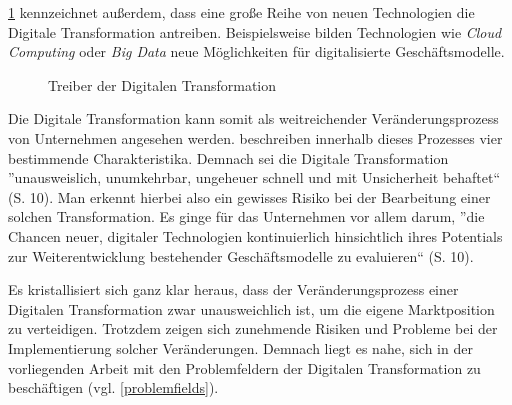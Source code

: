 \ref{fig:bigpicture} kennzeichnet außerdem, dass eine große Reihe von neuen Technologien die Digitale Transformation antreiben. Beispielsweise bilden Technologien wie \textit{Cloud Computing} oder \textit{Big Data} neue Möglichkeiten für digitalisierte Geschäftsmodelle. 
 
\begin{figure}[H]
	\centering
	\caption[Big-Picture der Digitalen Transformation]{Treiber der Digitalen Transformation \protect \cite[S. 20]{bloching_digitale_2015}}
	\label{fig:bigpicture}
\end{figure}

Die Digitale Transformation kann somit als weitreichender Veränderungsprozess von Unternehmen angesehen werden.  beschreiben innerhalb dieses Prozesses vier bestimmende Charakteristika. Demnach sei die Digitale Transformation ''unausweislich, unumkehrbar, ungeheuer schnell und mit Unsicherheit behaftet`` (S. 10). Man erkennt hierbei also ein gewisses Risiko bei der Bearbeitung einer solchen Transformation. Es ginge für das Unternehmen vor allem darum, ''die Chancen neuer, digitaler Technologien kontinuierlich hinsichtlich ihres Potentials zur Weiterentwicklung bestehender Geschäftsmodelle zu evaluieren`` (S. 10).

Es kristallisiert sich ganz klar heraus, dass der Veränderungsprozess einer Digitalen Transformation zwar unausweichlich ist, um die eigene Marktposition zu verteidigen. Trotzdem zeigen sich zunehmende Risiken und Probleme bei der Implementierung solcher Veränderungen. Demnach liegt es nahe, sich in der vorliegenden Arbeit mit den Problemfeldern der Digitalen Transformation zu beschäftigen (vgl. \ref{problemfields}).

